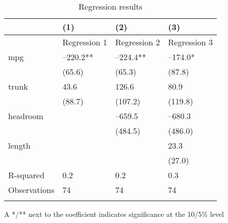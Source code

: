 \documentclass{article}
\begin{document}
\begin{table}[tbp] \centering
{}

\caption{Regression results}
\begin{tabularx}{\linewidth}{lCCC}

\toprule
&{(1)}&{(2)}&{(3)} \tabularnewline \midrule
{}&{Regression 1}&{Regression 2}&{Regression 3} \tabularnewline
\midrule \addlinespace[2ex]
mpg&--220.2**&--224.4**&--174.0* \tabularnewline
&(65.6)&(65.3)&(87.8) \tabularnewline
trunk&43.6&126.6&80.9 \tabularnewline
&(88.7)&(107.2)&(119.8) \tabularnewline
headroom&&--659.5&--680.3 \tabularnewline
&&(484.5)&(486.0) \tabularnewline
length&&&23.3 \tabularnewline
&&&(27.0) \tabularnewline
\midrule R-squared&0.2&0.2&0.3 \tabularnewline
Observations&74&74&74 \tabularnewline
\bottomrule \addlinespace[\belowrulesep]

\end{tabularx}
\begin{flushleft}
\footnotesize A */** next to the coefficient indicates significance at the 10/5\% level
\end{flushleft}
\end{table}
\end{document}
